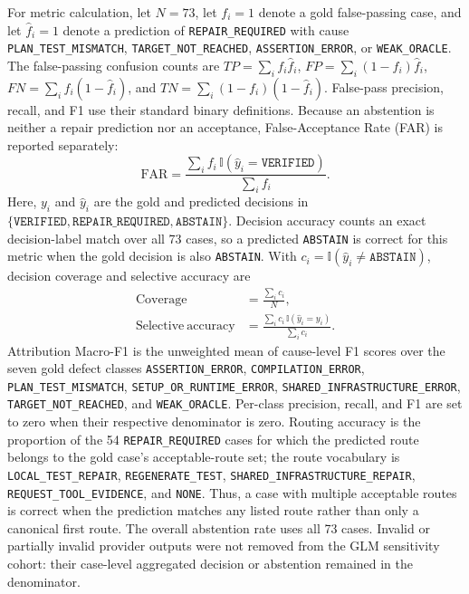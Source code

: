 \documentclass[pdflatex,sn-basic,Numbered,iicol]{sn-jnl}
\begin{document}
For metric calculation, let $N=73$, let $f_i=1$ denote a gold false-passing case, and let $\hat{f}_i=1$ denote a prediction of \texttt{REPAIR\_REQUIRED} with cause \texttt{PLAN\_TEST\_MISMATCH}, \texttt{TARGET\_NOT\_REACHED}, \texttt{ASSERTION\_ERROR}, or \texttt{WEAK\_ORACLE}. The false-passing confusion counts are $TP=\sum_i f_i\hat{f}_i$, $FP=\sum_i(1-f_i)\hat{f}_i$, $FN=\sum_i f_i(1-\hat{f}_i)$, and $TN=\sum_i(1-f_i)(1-\hat{f}_i)$. False-pass precision, recall, and F1 use their standard binary definitions. Because an abstention is neither a repair prediction nor an acceptance, False-Acceptance Rate (FAR) is reported separately:
\begin{equation}
\mathrm{FAR}=\frac{\sum_i f_i\,\mathbb{I}(\hat{y}_i=\texttt{VERIFIED})}{\sum_i f_i}.
\label{eq:rq3-far}
\end{equation}
Here, $y_i$ and $\hat{y}_i$ are the gold and predicted decisions in $\{\texttt{VERIFIED},\texttt{REPAIR\_REQUIRED},\texttt{ABSTAIN}\}$. Decision accuracy counts an exact decision-label match over all 73 cases, so a predicted \texttt{ABSTAIN} is correct for this metric when the gold decision is also \texttt{ABSTAIN}. With $c_i=\mathbb{I}(\hat{y}_i\neq\texttt{ABSTAIN})$, decision coverage and selective accuracy are
\begin{equation}
\begin{aligned}
\mathrm{Coverage} &= \frac{\sum_i c_i}{N},\\
\mathrm{Selective\ accuracy} &= \frac{\sum_i c_i\,\mathbb{I}(\hat{y}_i=y_i)}{\sum_i c_i}.
\end{aligned}
\label{eq:rq3-selective}
\end{equation}
Attribution Macro-F1 is the unweighted mean of cause-level F1 scores over the seven gold defect classes \texttt{ASSERTION\_ERROR}, \texttt{COMPILATION\_ERROR}, \texttt{PLAN\_TEST\_MISMATCH}, \texttt{SETUP\_OR\_RUNTIME\_ERROR}, \texttt{SHARED\_INFRASTRUCTURE\_ERROR}, \texttt{TARGET\_NOT\_REACHED}, and \texttt{WEAK\_ORACLE}. Per-class precision, recall, and F1 are set to zero when their respective denominator is zero. Routing accuracy is the proportion of the 54 \texttt{REPAIR\_REQUIRED} cases for which the predicted route belongs to the gold case's acceptable-route set; the route vocabulary is \texttt{LOCAL\_TEST\_REPAIR}, \texttt{REGENERATE\_TEST}, \texttt{SHARED\_INFRASTRUCTURE\_REPAIR}, \texttt{REQUEST\_TOOL\_EVIDENCE}, and \texttt{NONE}. Thus, a case with multiple acceptable routes is correct when the prediction matches any listed route rather than only a canonical first route. The overall abstention rate uses all 73 cases. Invalid or partially invalid provider outputs were not removed from the GLM sensitivity cohort: their case-level aggregated decision or abstention remained in the denominator.
\end{document}
